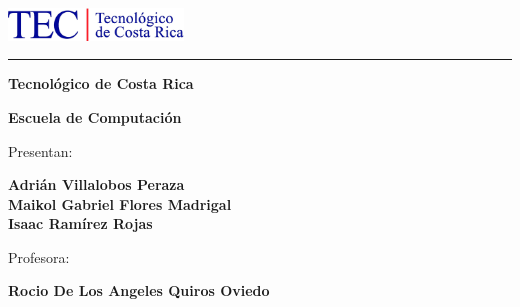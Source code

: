 \begin{titlepage}
    \begin{center}
    \includegraphics[width=0.35\textwidth]{logo-tecnm}\hspace{0.2in}
    
    \rule[1.2cm]{\textwidth}{3pt}
    
    \vspace{-1cm}
    {\Huge
    \textbf{Tecnológico de Costa Rica}\vspace*{0.5cm}
	}
    
    \huge
    \textbf{Escuela de Computación}\vspace*{1cm}
        
        {\LARGE   
        \myTitle}
        \vspace*{3.5cm}
        

		{\Large
		 Presentan:    
	
			\textbf{Adrián Villalobos Peraza}\\
			\textbf{Maikol Gabriel Flores Madrigal}\\
            \textbf{Isaac Ramírez Rojas}\\
		}

        
         \vspace*{1.2cm}
         {\Large
        	Profesora:
        
    		\textbf{Rocio De Los Angeles Quiros Oviedo}\\
		}
    
    	\vspace{0.1in}

    \vfill
        
 
    
    {\Large \myDate}
    
    
    
    \end{center}
\end{titlepage}